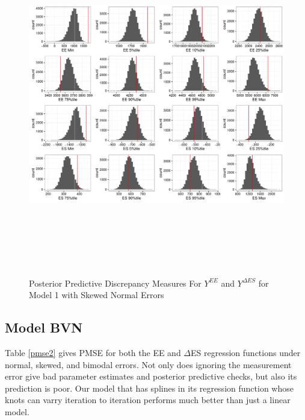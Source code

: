 \documentclass[11pt]{article}\usepackage[]{graphicx}\usepackage[]{color}
\begin{document}
  \begin{figure}
  \centering
  \includegraphics[width=17cm,height=15cm]{manual_figure/wpydiag1s.pdf}
  \caption{Posterior Predictive Discrepancy Measures For $Y^{EE}$ and $Y^{\Delta ES}$ for Model 1 with Skewed Normal Errors}
  \label{wpydiag1s}
  \end{figure}


\subsection{Model BVN}
% 

Table \ref{pmse2} gives PMSE for both the EE and $\Delta$ES regression functions under normal, skewed, and bimodal errors. Not only does ignoring the measurement error give bad parameter estimates and posterior predictive checks, but also its prediction is poor. Our model that has splines in its regression function  whose knots can varry iteration to iteration performs much better than just a linear model. 
\end{document}
